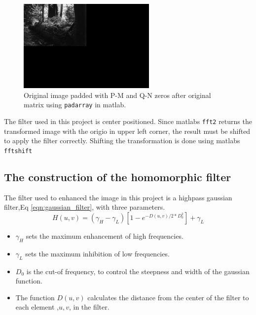 \begin{figure}[h!]
  \begin{center}
    \includegraphics[width=0.6\textwidth]{pics/zeroPadded.png}
  \end{center}
  \cprotect\caption{Original image padded with P-M and Q-N zeros after original matrix using \verb~padarray~ in matlab.}
  \label{fig:zeropadded}    
\end{figure}

The filter used in this project is center positioned. Since matlabs \verb~fft2~ returns the transformed image with the origio in upper left corner, the result must be shifted to apply the filter correctly. Shifting the transformation is done using matlabs \verb~fftshift~

\subsection{The construction of the homomorphic filter}
The filter used to enhanced the image in this project is a highpass gaussian filter,Eq \ref{eqn:gaussian_filter}, with three parameters. 
    \begin{equation}
    \label{eqn:gaussian_filter}
      H(u,v) = \left( \gamma_H - \gamma_L \right) \left[ 1 - e^{- D(u,v) /2 * D_0^2}\right] + \gamma_L 
    \end{equation}

\begin{itemize}
  \item $\gamma_H$ sets the maximum enhancement of high frequencies.
  \item $\gamma_L$ sets the maximum inhibition of low frequencies.
  \item $D_0$ is the cut-of frequency, to control the steepness and width of the gaussian function.
  \item The function $D(u,v)$ calculates the distance from the center of the filter to each element ,$u,v$, in the filter.  
\end{itemize}

